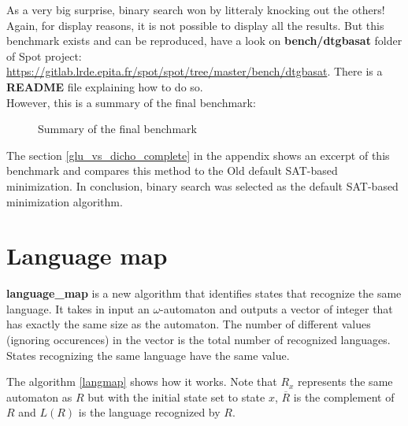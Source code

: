 \noindent As a very big surprise, binary search won by litteraly knocking out the others! Again, for display
reasons, it is not possible to display all the results. But this benchmark exists and can be
reproduced, have a look on \textbf{bench/dtgbasat} folder of Spot project:
\url{https://gitlab.lrde.epita.fr/spot/spot/tree/master/bench/dtgbasat}. There is a \textbf{README} file
explaining how to do so.\\

However, this is a summary of the final benchmark:
\begin{figure}[H]
 \centering
 
 \caption{Summary of the final benchmark}
 \label{fig:final_bench_resume}
\end{figure}

\noindent The section \ref{glu_vs_dicho_complete} in the appendix shows an excerpt of this benchmark and
compares this method to the Old default SAT-based minimization. In conclusion, binary search was selected
as the default SAT-based minimization algorithm.

\section{Language map}
\textbf{language\_map} is a new algorithm that identifies states that recognize the same language.
It takes in input an $\omega$-automaton and outputs a vector of integer that has exactly the same
size as the automaton. The number of different values (ignoring occurences) in the vector is the
total number of recognized languages. States recognizing the same language have the same value.\\
\newcommand{\stcomp}[1]{\overline{#1}}
\begin{algorithm}[h]
 \caption{}
 \label{langmap}
 \begin{algorithmic}[1]
     \If{$\textit{L}(R_i) \cap \stcomp{\textit{L}(R_j)} \neq \emptyset \land \stcomp{\textit{L}(R_i)} \cap \textit{L}(R_j) \neq \emptyset$}
     \EndIf
    \EndFor
   \EndFor
  \EndProcedure
 \end{algorithmic}
\end{algorithm}
\noindent The algorithm \ref{langmap} shows how it works. Note that $R_x$ represents the same automaton as $R$ but
with the initial state set to state $x$, $\stcomp{R}$ is the complement of $R$ and $\textit{L}(R)$
is the language recognized by $R$.\\


